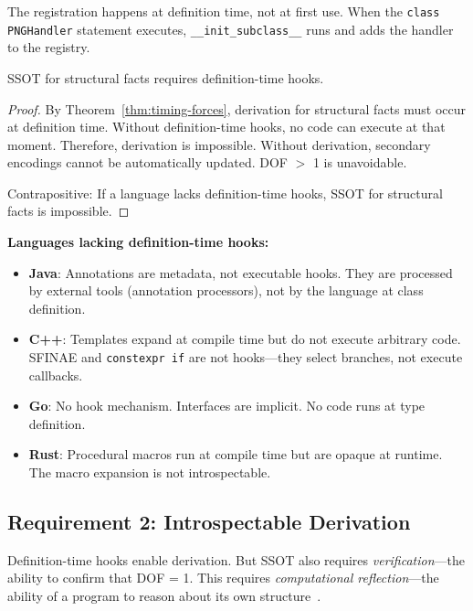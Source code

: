 The registration happens at definition time, not at first use. When the \texttt{class PNGHandler} statement executes, \texttt{\_\_init\_subclass\_\_} runs and adds the handler to the registry.

\begin{theorem}\label{thm:hooks-necessary}
SSOT for structural facts requires definition-time hooks.
\end{theorem}

\begin{proof}
By Theorem~\ref{thm:timing-forces}, derivation for structural facts must occur at definition time. Without definition-time hooks, no code can execute at that moment. Therefore, derivation is impossible. Without derivation, secondary encodings cannot be automatically updated. DOF $>$ 1 is unavoidable.

Contrapositive: If a language lacks definition-time hooks, SSOT for structural facts is impossible.
\end{proof}

\textbf{Languages lacking definition-time hooks:}

\begin{itemize}
\tightlist
\item \textbf{Java}: Annotations are metadata, not executable hooks. They are processed by external tools (annotation processors), not by the language at class definition.
\item \textbf{C++}: Templates expand at compile time but do not execute arbitrary code. SFINAE and \texttt{constexpr if} are not hooks---they select branches, not execute callbacks.
\item \textbf{Go}: No hook mechanism. Interfaces are implicit. No code runs at type definition.
\item \textbf{Rust}: Procedural macros run at compile time but are opaque at runtime. The macro expansion is not introspectable.
\end{itemize}

\subsection{Requirement 2: Introspectable Derivation}\label{sec:introspection}

Definition-time hooks enable derivation. But SSOT also requires \emph{verification}---the ability to confirm that DOF = 1. This requires \emph{computational reflection}---the ability of a program to reason about its own structure~\cite{smith1984reflection}.

